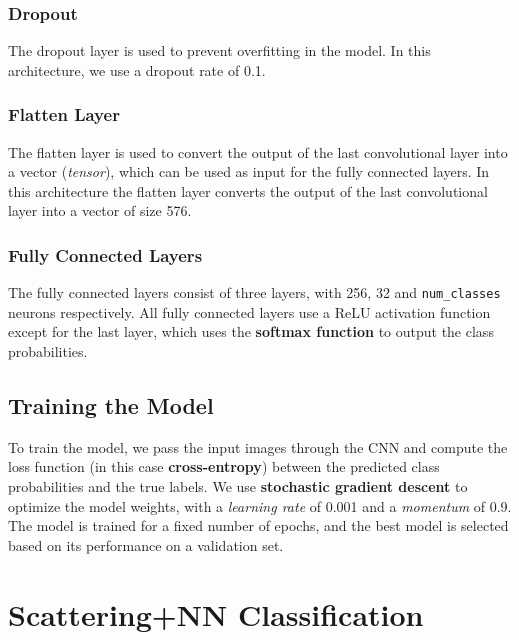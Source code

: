 \documentclass{report}
\begin{document}
\subsection{Dropout}

The dropout layer is used to prevent overfitting in the model. In this architecture, we use a dropout rate of 0.1.
\subsection{Flatten Layer}

The flatten layer is used to convert the output of the last convolutional layer into a vector (\textit{tensor}), which can be used as input for the fully connected layers. In this architecture the flatten layer converts the output of the last convolutional layer into a vector of size 576.

\subsection{Fully Connected Layers}
The fully connected layers consist of three layers, with 256, 32 and \texttt{num\_classes} neurons respectively. All fully connected layers use a ReLU activation function except for the last layer, which uses the \textbf{softmax function} to output the class probabilities.

\section{Training the Model}

To train the model, we pass the input images through the CNN and compute the loss function (in this case \textbf{cross-entropy}) between the predicted class probabilities and the true labels. We use \textbf{stochastic gradient descent} to optimize the model weights, with a \textit{learning rate} of 0.001 and a \textit{momentum} of 0.9. The model is trained for a fixed number of epochs, and the best model is selected based on its performance on a validation set.

\chapter{Scattering+NN Classification}
\end{document}
